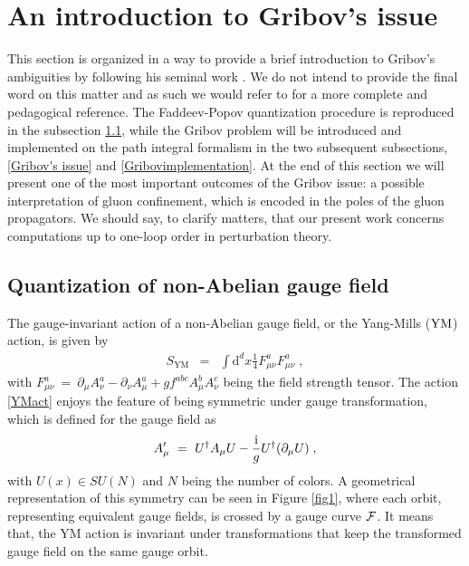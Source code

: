 \section{An introduction to Gribov's issue}
\label{introGribov}

This section is organized in a way to provide a brief introduction to Gribov's ambiguities by
following his seminal work \cite{Gribov:1977wm}. We do not intend to provide the final word on
this matter and as such we would refer to \cite{Vandersickel:2012tz} for a more complete and
pedagogical reference. The Faddeev-Popov quantization procedure is reproduced in the subsection
\ref{introductiontogribov1}, while the Gribov problem will be introduced and implemented on the
path integral formalism in the two subsequent subsections, \ref{Gribov's issue} and
\ref{Gribovimplementation}. At the end of this section we will present one of the most
important outcomes of the Gribov issue: a possible interpretation of gluon confinement, which
is encoded in the poles of the gluon propagators. We should say, to clarify matters, that our
present work concerns computations up to one-loop order in perturbation theory.






\subsection{Quantization of non-Abelian gauge field}
\label{introductiontogribov1}

The gauge-invariant action of a non-Abelian gauge field, or the Yang-Mills ($\mathrm{YM}$) action, is given by
\begin{eqnarray}
S_{\text{YM}} &=& \int \mathrm{d}^d x \frac{1}{4}  F_{\mu\nu}^a  F_{\mu\nu}^a \;,
\label{YMact}
\end{eqnarray}
with $
F^{a}_{\mu\nu} ~=~ \partial_{\mu}A^{a}_{\nu} - \partial_{\nu}A^{a}_{\mu} + gf^{abc}A^{b}_{\mu}A^{c}_{\nu}
$ 
being the field strength tensor. The action \eqref{YMact} enjoys the feature of being symmetric under gauge transformation, which is defined for the gauge field as
\begin{eqnarray}
A_{\mu}' ~=~ U^{\dagger}A_{\mu}U - \frac{\mathrm{i}}{g} U^{\dagger}(\partial_\mu U)\;,
\label{gaugetransf}
\end{eqnarray}
with $U(x) \in SU(N)$ and $N$ being the number of colors. A geometrical representation of this symmetry can be seen in Figure \ref{fig1}, where each orbit, representing equivalent gauge fields, is crossed by a gauge curve ${\cal F}$. It means that, the YM action is invariant under transformations that keep the transformed gauge field on the same gauge orbit.

